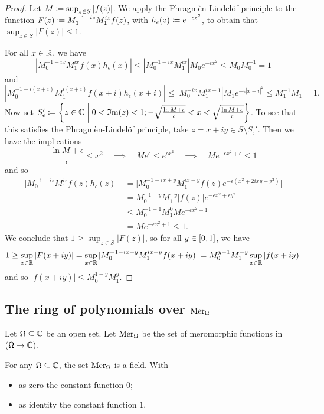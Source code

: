 \begin{proof}
Let $M \coloneqq \sup_{z\in S}|f(z)|$. We apply the Phragmèn-Lindelöf principle to the function $F(z) \coloneqq M_0^{-1-iz}M_1^{iz}f(z)$, with $h_\epsilon(z) \coloneqq e^{-\epsilon z^2}$, to obtain that $\sup_{z\in S}|F(z)| \leq 1$.

For all $x\in \mathbb{R}$, we have
\[ |M_0^{-1-ix}M_1^{ix}f(x)h_\epsilon(x)| \leq |M_0^{-1-ix}M_1^{ix}|M_0 e^{-\epsilon x^2} \leq M_0M_0^{-1} = 1 \]
and
\[ |M_0^{-1-i(x+i)}M_1^{i(x+i)}f(x+i)h_\epsilon(x+i)| \leq |M_0^{-ix}M_1^{ix -1}|M_1 e^{-\epsilon |x+i|^2} \leq M_1^{-1}M_1 =  1. \]
Now set $S'_\epsilon \defeq \setbuilder{z\in \C}{0<\Im(z)< 1; -\sqrt{\frac{\ln M + \epsilon}{\epsilon}} < x < \sqrt{\frac{\ln M + \epsilon}{\epsilon}}}$. To see that this satisfies the Phragmèn-Lindelöf principle, take $z = x+iy \in S\setminus S_\epsilon'$.
Then we have the implications
\[ \frac{\ln M + \epsilon}{\epsilon} \leq x^2 \quad\implies\quad Me^{\epsilon} \leq e^{\epsilon x^2} \quad\implies\quad Me^{-\epsilon x^2 + \epsilon} \leq 1 \]
and so
\begin{align*}
\big|M_0^{-1-iz}M_1^{iz}f(z)h_\epsilon(z)\big| &= \big|M_0^{-1-ix +y}M_1^{ix - y}f(z)e^{-\epsilon (x^2 + 2ixy - y^2)}\big| \\
&= M_0^{-1 +y}M_1^{- y}\big|f(z)\big|e^{-\epsilon x^2 + \epsilon y^2} \\
&\leq M_0^{-1 +1}M_1^{0}Me^{-\epsilon x^2 + 1} \\
&= Me^{-\epsilon x^2 + 1} \leq 1.
\end{align*}
We conclude that $1 \geq \sup_{z\in S}|F(z)|$, so for all $y\in \interval{0,1}$, we have
\[ 1 \geq \sup_{x \in \mathbb{R}}|F(x+iy)| = \sup_{x \in \mathbb{R}}|M_0^{-1-ix+y}M_1^{ix-y}f(x+iy)| = M_0^{y-1}M_1^{-y}\sup_{x \in \mathbb{R}}|f(x+iy)| \]
and so $|f(x+iy)| \leq M_0^{1-y}M_1^{y}$.
\end{proof}


\subsection{The ring of polynomials over $\operatorname{Mer}_\Omega$}

\begin{definition}
Let $\Omega\subseteq \mathbb{C}$ be an open set. Let $\operatorname{Mer}_\Omega$ be the set of meromorphic functions in $(\Omega \to \mathbb{C})$.
\end{definition}

\begin{proposition}
For any $\Omega \subseteq \mathbb{C}$, the set $\operatorname{Mer}_\Omega$ is a field. With
\begin{itemize}
\item as zero the constant function $\underline{0}$;
\item as identity the constant function $\underline{1}$.
\end{itemize}
\end{proposition}

